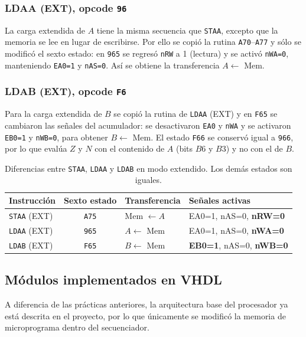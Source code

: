 \documentclass[letterpaper,12pt]{article}
\newcommand{\hx}[1]{\texttt{#1}}
\begin{document}
\subsubsection{LDAA (EXT), opcode \texttt{96}}

La carga extendida de $A$ tiene la misma secuencia que \texttt{STAA}, excepto que la memoria se lee en lugar de escribirse. Por ello se copió la rutina \hx{A70}--\hx{A77} y sólo se modificó el sexto estado: en \hx{965} se regresó \texttt{nRW} a 1 (lectura) y se activó \texttt{nWA=0}, manteniendo \texttt{EA0=1} y \texttt{nAS=0}. Así se obtiene la transferencia $A\leftarrow$ Mem.

\subsubsection{LDAB (EXT), opcode \texttt{F6}}

Para la carga extendida de $B$ se copió la rutina de \texttt{LDAA} (EXT) y en \hx{F65} se cambiaron las señales del acumulador: se desactivaron \texttt{EA0} y \texttt{nWA} y se activaron \texttt{EB0=1} y \texttt{nWB=0}, para obtener $B\leftarrow$ Mem. El estado \hx{F66} se conservó igual a \hx{966}, por lo que evalúa $Z$ y $N$ con el contenido de $A$ (bits $B6$ y $B3$) y no con el de $B$. 

\begin{table}[H]
\centering
\scriptsize
\caption{Diferencias entre \texttt{STAA}, \texttt{LDAA} y \texttt{LDAB} en modo extendido. Los demás estados son iguales.}
\label{tab:ldabext}
\begin{tabularx}{\linewidth}{l c l Y}
\toprule
Instrucción & Sexto estado & Transferencia & Señales activas \\
\midrule
\texttt{STAA} (EXT) & \hx{A75} & Mem $\leftarrow A$ & EA0=1, nAS=0, \textbf{nRW=0} \\
\texttt{LDAA} (EXT) & \hx{965} & $A\leftarrow$ Mem & EA0=1, nAS=0, \textbf{nWA=0} \\
\texttt{LDAB} (EXT) & \hx{F65} & $B\leftarrow$ Mem & \textbf{EB0=1}, nAS=0, \textbf{nWB=0} \\
\bottomrule
\end{tabularx}
\end{table}

\subsection{Módulos implementados en VHDL}

A diferencia de las prácticas anteriores, la arquitectura base del procesador ya está descrita en el proyecto, por lo que únicamente se modificó la memoria de microprograma dentro del secuenciador.
\end{document}

